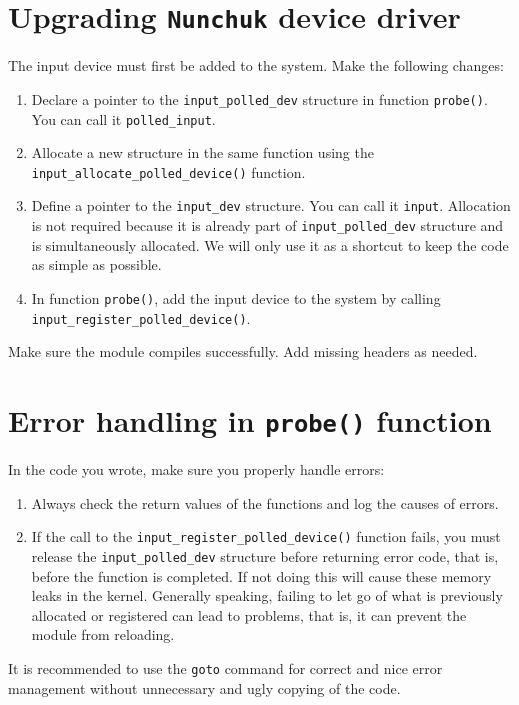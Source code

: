 \documentclass[11pt]{article}
\begin{document}
\section{Upgrading \texttt{Nunchuk} device driver}
The input device must first be added to the system. Make the following changes:
\begin{enumerate}
	\item Declare a pointer to the \texttt{input\_polled\_dev} structure in
		function \texttt{probe()}. You can call it \texttt{polled\_input}.
	\item Allocate a new structure in the same function using the\\
		\texttt{input\_allocate\_polled\_device()} function.
	\item Define a pointer to the \texttt{input\_dev} structure. You can call it
		\texttt{input}. Allocation is not required because it is already part of
		\texttt{input\_polled\_dev} structure and is simultaneously allocated.
		We will only use it as a shortcut to keep the code as simple as
		possible.
	\item In function \texttt{probe()}, add the input device to the system by
		calling \texttt{input\_register\_polled\_device()}.
\end{enumerate}
Make sure the module compiles successfully. Add missing headers as needed.

\section{Error handling in \texttt{probe()} function}
In the code you wrote, make sure you properly handle errors:
\begin{enumerate}
	\item Always check the return values of the functions and log the causes of
		errors.
	\item If the call to the \texttt{input\_register\_polled\_device()} function
		fails, you must release the \texttt{input\_polled\_dev} structure before
		returning error code, that is, before the function is completed. If
		not doing this will cause these memory leaks in the kernel. Generally
		speaking, failing to let go of what is previously allocated or
		registered can lead to problems, that is, it can prevent the module from
		reloading.
\end{enumerate}
It is recommended to use the \texttt{goto} command for correct and nice error
 management without unnecessary and ugly copying of the code.
\end{document}
